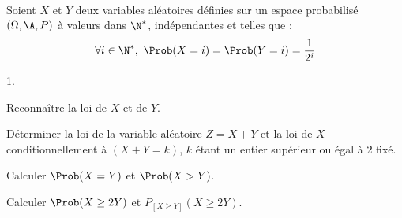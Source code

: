\documentclass[11pt]{article}%
\begin{document}
\begin{exerciceSP}~\\
  Soient $X$ et $Y$ deux variables aléatoires définies sur un espace
  probabilisé $(\Omega , \A , P)$ à valeurs dans $\N^*$,
  indépendantes et telles que :
  \[
  \forall i \in \N^*,\ \Prob(X=i) = \Prob(Y=i) = \frac{1}{2^i}
  \] 
  \begin{noliste}{1.}
    \setlength{\itemsep}{2mm}
  \item Reconnaître la loi de $X$ et de $Y$.
  \item Déterminer la loi de la variable aléatoire $Z = X+Y$ et la loi
    de $X$ conditionnellement à $(X + Y = k)$, $k$ étant un entier
    supérieur ou égal à 2 fixé.
  \item Calculer $\Prob(X=Y)$ et $\Prob(X > Y)$.
  \item Calculer $\Prob(X \geq 2 Y)$ et $P_{[ X \geq Y]} (X \geq 2 Y)$.
  \end{noliste}
\end{exerciceSP}


\newpage
\end{document}
